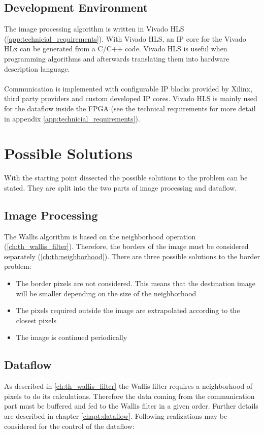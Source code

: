 \subsection{Development Environment}
The image processing algorithm is written in Vivado HLS (\ref{app:technicial_requirements}). With Vivado HLS, an IP core for the Vivado HLx can be generated from a C/C++ code. Vivado HLS is useful when programming algorithms and afterwards translating them into hardware description language. \\ 
\\
Communication is implemented with configurable IP blocks provided by Xilinx,
third party providers and custom developed IP cores. Vivado HLS is mainly used
for the dataflow inside the FPGA
(see the technical requirements for more detail in appendix 
\ref{app:technicial_requirements}).

%
%
\section{Possible Solutions} \label{chapt:solutions}
With the starting point dissected the possible solutions to the problem can be
stated. They are split into the two parts of image processing and dataflow.

\subsection{Image Processing} \label{chapt:mission:ip}
The Wallis algorithm is based on the neighborhood operation (\ref{ch:th_wallis_filter}). Therefore, the borders of the image must be considered separately (\ref{ch:th:neighborhood}). There are three possible solutions to the border problem:

\begin{itemize}
\item The border pixels are not considered. This means that the destination image will be smaller depending on the size of the neighborhood
\item The pixels required outside the image are extrapolated according to the closest pixels
\item The image is continued periodically
\end{itemize}

\subsection{Dataflow} \label{chapt:mission:dataflow}
As described in \ref{ch:th_wallis_filter} the Wallis filter requires a
neighborhood of pixels to do its calculations. Therefore the data coming from
the communication part must be buffered and fed to the Wallis filter in a given
order. Further details are described in chapter \ref{chapt:dataflow}. Following
realizations may be considered for the control of the dataflow:\\

